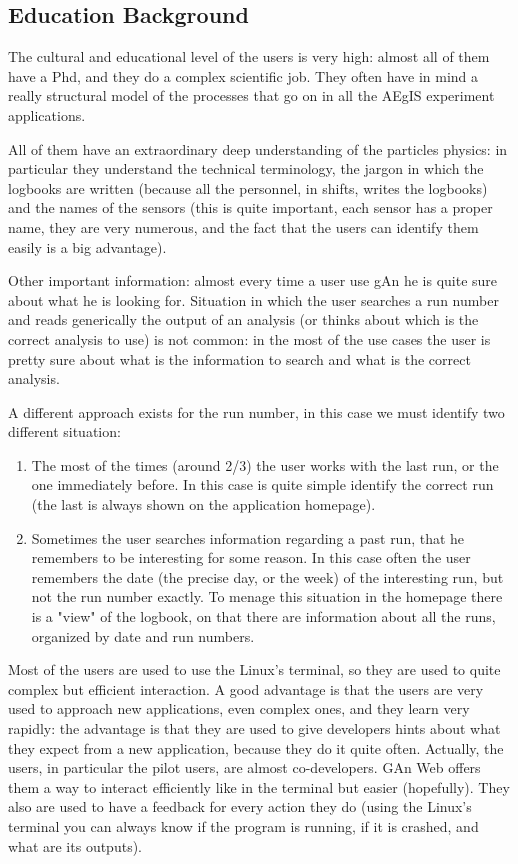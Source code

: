 \subsection{Education Background}
The cultural and educational level of the users is very high: almost all of them have a Phd, and they do a complex scientific job. They often have in mind a really structural model of the processes that go on in all the AEgIS experiment applications.

All of them have an extraordinary deep understanding of the particles physics: in particular they understand the technical terminology, the jargon in which the logbooks are written (because all the personnel, in shifts, writes the logbooks) and the names of the sensors (this is quite important, each sensor has a proper name, they are very numerous, and the fact that the users can identify them easily is a big advantage). 

Other important information: almost every time a user use gAn he is quite sure about what he is looking for. Situation in which the user searches a run number and reads generically the output of an analysis (or thinks about which is the correct analysis to use) is not common: in the most of the use cases the user is pretty sure about what is the information to search and what is the correct analysis. 

A different approach exists for the run number, in this case we must identify two different situation:

\begin{enumerate}

\item The most of the times (around 2/3) the user works with the last run, or the one immediately before. In this case is quite simple identify the correct run (the last is always shown on the application homepage).
\item Sometimes the user searches information regarding a past run, that he remembers to be interesting for some reason. In this case often the user remembers the date (the precise day, or the week) of the interesting run, but not the run number exactly. To menage this situation in the homepage there is a "view" of the logbook, on that there are information about all the runs, organized by date and run numbers. 

\end{enumerate}

Most of the users are used to use the Linux's terminal, so they are used to quite complex but efficient interaction. A good advantage is that the users are very used to approach new applications, even complex ones, and they learn very rapidly: the advantage is that they are used to give developers hints about what they expect from a new application, because they do it quite often. Actually, the users, in particular the pilot users, are almost co-developers. GAn Web offers them a way to interact efficiently like in the terminal but easier (hopefully). They also are used to have a feedback for every action they do (using the Linux's terminal you can always know if the program is running, if it is crashed, and what are its outputs).

